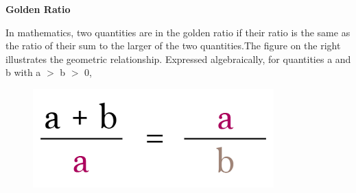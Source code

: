 \documentclass[12pt]{article}
\begin{document}
\begin{center}\textbf{Golden Ratio}\end{center}

In mathematics, two quantities are in the golden ratio if their ratio is the same as the ratio of their sum to the larger of the two quantities.The figure on the right illustrates the geometric relationship. Expressed algebraically, for quantities a and b with a $>$ b $>$ 0,
\begin{figure}[h]
    \centering
    \includegraphics[scale=0.3]{download.png}
\end{figure}
\end{document}
